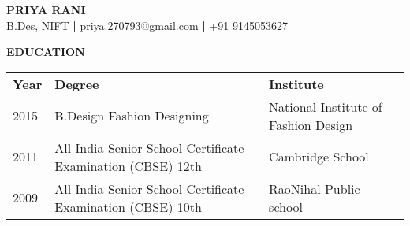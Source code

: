 \documentclass[a4paper]{deedy-resume} %
\begin{document}
{\noindent\uppercase{\textbf{\LARGE{Priya Rani}}}\\}
\hspace{73pt}B.Des, NIFT\hspace{8pt}  \textbf{|}\hspace{8pt} priya.270793@gmail.com \hspace{8pt}\textbf{|}\hspace{8pt} +91 9145053627 \runlocation
\noindent\makebox[\linewidth]{\color{headings}\rule{\paperwidth}{0.6pt}} %
\vspace{-5pt}
\sectionspace


{\uppercase\uline{\textbf{\large{Education}}\hfill}}
\microspace
\sectionspace

\begin{tabular}{|l|l|l|}
\cline{1-3}
\rule{0pt}{2.1ex}
\textbf{\hspace{20pt}Year\hspace{20pt} }&\textbf{\hspace{120pt}Degree\hspace{120pt} }&\textbf{\hspace{70pt}Institute\hspace{80pt}}\\
\cline{1-3}
\hspace{20pt}2015 & \hspace{80pt}B.Design Fashion Designing & \hspace{10pt}National Institute of Fashion Design\hspace{10pt} \\
\hspace{20pt}2011& \hspace{32pt}All India Senior School Certificate Examination (CBSE) 12th &\hspace{47pt}Cambridge School\hspace{45pt}\\
\hspace{20pt}2009&\hspace{32pt}All India Senior School Certificate Examination (CBSE) 10th\hspace{17pt} &\hspace{38pt}RaoNihal Public school\\
\cline{1-3}
\end{tabular}
\sectionspace
\sectionspace
\sectionspace
\sectionspace
\end{document}
